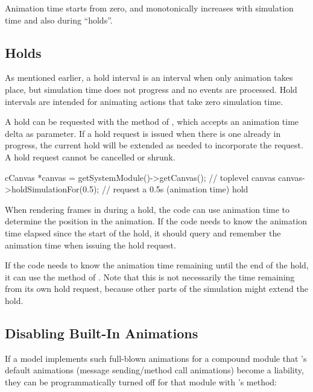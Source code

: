 Animation time starts from zero, and monotonically increases with simulation
time and also during ``holds''.


\subsection{Holds}
\label{sec:graphics:animation-hold}

As mentioned earlier, a hold interval is an interval when only animation
takes place, but simulation time does not progress and no events
are processed. Hold intervals are intended for animating actions
that take zero simulation time.

A hold can be requested with the  method
of , which accepts an animation time delta as parameter.
If a hold request is issued when there is one already in progress,
the current hold will be extended as needed to incorporate the
request. A hold request cannot be cancelled or shrunk.

\begin{cpp}
cCanvas *canvas = getSystemModule()->getCanvas(); // toplevel canvas
canvas->holdSimulationFor(0.5); // request a 0.5s (animation time) hold
\end{cpp}

When rendering frames in  during a hold, the code
can use animation time to determine the position in the animation.
If the code needs to know the animation time elapsed since the start of
the hold, it should query and remember the animation time when issuing
the hold request.

If the code needs to know the animation time remaining until the end
of the hold, it can use the 
method of . Note that this is not necessarily the
time remaining from its own hold request, because other parts of the
simulation might extend the hold.


\subsection{Disabling Built-In Animations}
\label{sec:graphics:disabling-built-in-anims}

If a model implements such full-blown animations for a compound module that
{\opp}'s default animations (message sending/method call animations) become
a liability, they can be programmatically turned off for that module with
's  method:

